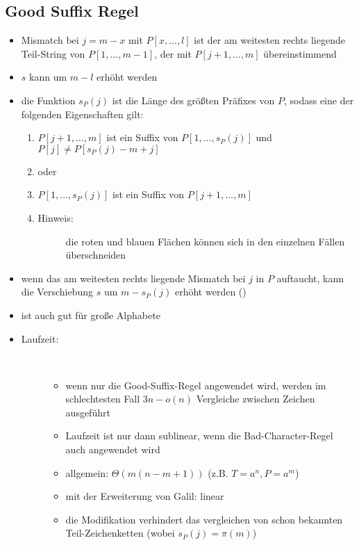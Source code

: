 \subsection{Good Suffix Regel}
\vspace*{-0.5\baselineskip}\begin{itemize}[itemsep=-1pt]
	\item Mismatch bei $j=m-x$ mit $P[x,\dots,l]$ ist der am weitesten rechts liegende Teil-String von $P[1,\dots,m-1]$, der mit $P[j+1,\dots,m]$ übereinstimmend
	\item $s$ kann um $m-l$ erhöht werden
	\item die Funktion $s_P(j)$ ist die Länge des größten Präfixes von $P$, sodass eine der folgenden Eigenschaften gilt:
		\begin{enumerate}
			\item $P[j+1,\dots,m]$ ist ein Suffix von $P[1,\dots,s_P(j)]$ und $P[j] \neq P[s_P(j)-m+j]$\\\up
				
			\item[] oder
			\item $P[1,\dots,s_P(j)]$ ist ein Suffix von $P[j+1,\dots,m]$\\\up
				
			\item[]\begin{description}
				\item[Hinweis:] die roten und blauen Flächen können sich in den einzelnen Fällen überschneiden
				\end{description} 
		\end{enumerate}
	\item wenn das am weitesten rechts liegende Mismatch bei $j$ in $P$ auftaucht, kann die Verschiebung $s$ um $m-s_P(j)$ erhöht werden ()%
	\item ist auch gut für große Alphabete
	\item \begin{description}
		\item[Laufzeit:]\ \\\up
			\begin{itemize}
				\item wenn nur die Good-Suffix-Regel angewendet wird, werden im schlechtesten Fall $3n-o(n)$ Vergleiche zwischen Zeichen ausgeführt
				\item Laufzeit ist nur dann sublinear, wenn die Bad-Character-Regel auch angewendet wird
				\item allgemein: $\Theta(m(n-m+1))$ (z.B. $T=a^n,P=a^m$)
				\item mit der Erweiterung von Galil: linear
				\item die Modifikation verhindert das vergleichen von schon bekannten Teil-Zeichenketten (wobei $s_P(j)=\pi(m)$)
			\end{itemize}
	\end{description}
\end{itemize}